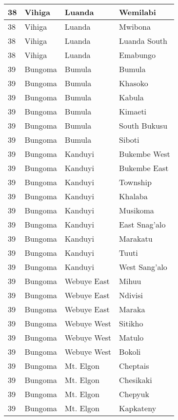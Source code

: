 \begin{table}[!ht]
\begin{tabular}{|l|l|l|l|}
        38 & Vihiga & Luanda & Wemilabi \\ \hline
        38 & Vihiga & Luanda & Mwibona \\ \hline
        38 & Vihiga & Luanda & Luanda South \\ \hline
        38 & Vihiga & Luanda & Emabungo \\ \hline
        39 & Bungoma & Bumula & Bumula \\ \hline
        39 & Bungoma & Bumula & Khasoko \\ \hline
        39 & Bungoma & Bumula & Kabula \\ \hline
        39 & Bungoma & Bumula & Kimaeti \\ \hline
        39 & Bungoma & Bumula & South Bukusu \\ \hline
        39 & Bungoma & Bumula & Siboti \\ \hline
        39 & Bungoma & Kanduyi & Bukembe West \\ \hline
        39 & Bungoma & Kanduyi & Bukembe East \\ \hline
        39 & Bungoma & Kanduyi & Township \\ \hline
        39 & Bungoma & Kanduyi & Khalaba \\ \hline
        39 & Bungoma & Kanduyi & Musikoma \\ \hline
        39 & Bungoma & Kanduyi & East Snag’alo \\ \hline
        39 & Bungoma & Kanduyi & Marakatu \\ \hline
        39 & Bungoma & Kanduyi & Tuuti \\ \hline
        39 & Bungoma & Kanduyi & West Sang’alo \\ \hline
        39 & Bungoma & Webuye East & Mihuu \\ \hline
        39 & Bungoma & Webuye East & Ndivisi \\ \hline
        39 & Bungoma & Webuye East & Maraka \\ \hline
        39 & Bungoma & Webuye West & Sitikho \\ \hline
        39 & Bungoma & Webuye West & Matulo \\ \hline
        39 & Bungoma & Webuye West & Bokoli \\ \hline
        39 & Bungoma & Mt. Elgon & Cheptais \\ \hline
        39 & Bungoma & Mt. Elgon & Chesikaki \\ \hline
        39 & Bungoma & Mt. Elgon & Chepyuk \\ \hline
        39 & Bungoma & Mt. Elgon & Kapkateny \\ \hline

\end{tabular}
\end{table}
